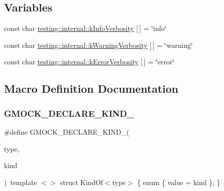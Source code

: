 \subsection*{Variables}
\begin{DoxyCompactItemize}
\item 
const char \hyperlink{namespacetesting_1_1internal_a96274a788ffc75a6dffdfa8aa1f34fb9}{testing\+::internal\+::k\+Info\+Verbosity} \mbox{[}$\,$\mbox{]} = \char`\"{}info\char`\"{}
\item 
const char \hyperlink{namespacetesting_1_1internal_ad9386ccda6b6deac2f7b84784d3088c0}{testing\+::internal\+::k\+Warning\+Verbosity} \mbox{[}$\,$\mbox{]} = \char`\"{}warning\char`\"{}
\item 
const char \hyperlink{namespacetesting_1_1internal_a3d730761274e7b80dd66e5014171fcb5}{testing\+::internal\+::k\+Error\+Verbosity} \mbox{[}$\,$\mbox{]} = \char`\"{}error\char`\"{}
\end{DoxyCompactItemize}


\subsection{Macro Definition Documentation}
\mbox{\label{gmock-internal-utils_8h_a7d8a1871d7a30543a4e1882a8b2bbcd8}} 
\subsubsection{\texorpdfstring{G\+M\+O\+C\+K\+\_\+\+D\+E\+C\+L\+A\+R\+E\+\_\+\+K\+I\+N\+D\+\_\+}{GMOCK\_DECLARE\_KIND\_}}
{\footnotesize\ttfamily \#define G\+M\+O\+C\+K\+\_\+\+D\+E\+C\+L\+A\+R\+E\+\_\+\+K\+I\+N\+D\+\_\+(\begin{DoxyParamCaption}\item[{}]{type,  }\item[{}]{kind }\end{DoxyParamCaption})~template $<$$>$ struct Kind\+Of$<$type$>$ \{ enum \{ value = kind \}; \}}

\mbox{\label{gmock-internal-utils_8h_a8ee49a1af821b48fd83849c050d0d5a2}} 
